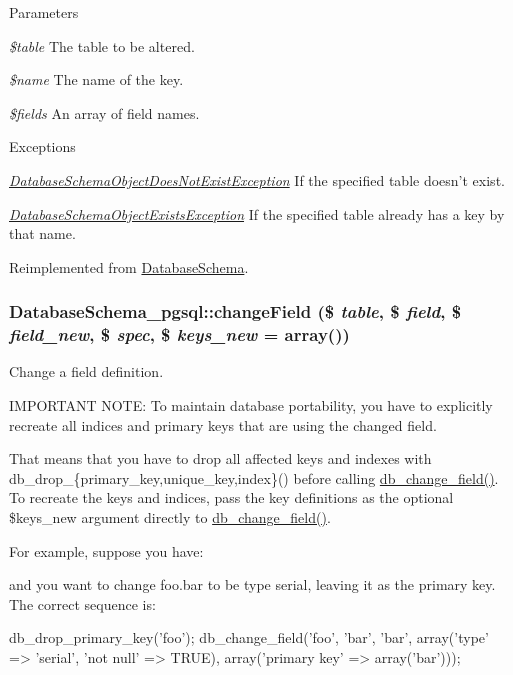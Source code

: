 \begin{DoxyParams}{Parameters}
\item[{\em \$table}]The table to be altered. \item[{\em \$name}]The name of the key. \item[{\em \$fields}]An array of field names.\end{DoxyParams}

\begin{DoxyExceptions}{Exceptions}
\item[{\em \hyperlink{classDatabaseSchemaObjectDoesNotExistException}{DatabaseSchemaObjectDoesNotExistException}}]If the specified table doesn't exist. \item[{\em \hyperlink{classDatabaseSchemaObjectExistsException}{DatabaseSchemaObjectExistsException}}]If the specified table already has a key by that name. \end{DoxyExceptions}


Reimplemented from \hyperlink{classDatabaseSchema_ac2e6358da1c2d38fe6a1a1d003dac8ca}{DatabaseSchema}.\hypertarget{classDatabaseSchema__pgsql_adae800c8871e30a70f3896b730c12ed3}{
\subsubsection[{changeField}]{\setlength{\rightskip}{0pt plus 5cm}DatabaseSchema\_\-pgsql::changeField (\$ {\em table}, \/  \$ {\em field}, \/  \$ {\em field\_\-new}, \/  \$ {\em spec}, \/  \$ {\em keys\_\-new} = {\ttfamily array()})}}
\label{classDatabaseSchema__pgsql_adae800c8871e30a70f3896b730c12ed3}
Change a field definition.

IMPORTANT NOTE: To maintain database portability, you have to explicitly recreate all indices and primary keys that are using the changed field.

That means that you have to drop all affected keys and indexes with db\_\-drop\_\-\{primary\_\-key,unique\_\-key,index\}() before calling \hyperlink{group__schemaapi_ga9e0a4211eb8137e187d5f3f4fa716cea}{db\_\-change\_\-field()}. To recreate the keys and indices, pass the key definitions as the optional \$keys\_\-new argument directly to \hyperlink{group__schemaapi_ga9e0a4211eb8137e187d5f3f4fa716cea}{db\_\-change\_\-field()}.

For example, suppose you have: 
 and you want to change foo.bar to be type serial, leaving it as the primary key. The correct sequence is: 
\begin{DoxyCode}
 db_drop_primary_key('foo');
 db_change_field('foo', 'bar', 'bar',
   array('type' => 'serial', 'not null' => TRUE),
   array('primary key' => array('bar')));
\end{DoxyCode}


